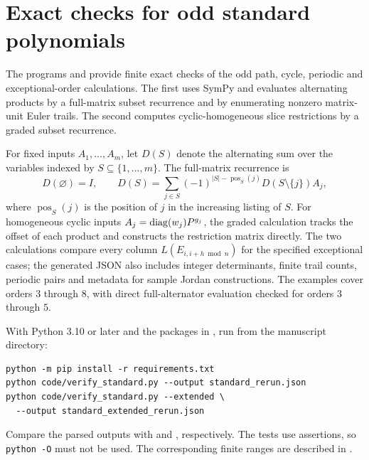 \section{Exact checks for odd standard polynomials}\label{app:verification}
The programs  and
 provide finite exact checks of the odd
path, cycle, periodic and exceptional-order calculations.
The first uses SymPy and evaluates alternating products by a
full-matrix subset recurrence and by enumerating nonzero
matrix-unit Euler trails. The second computes cyclic-homogeneous
slice restrictions by a graded subset recurrence.

For fixed inputs $A_1,\ldots,A_m$, let $D(S)$ denote the alternating
sum over the variables indexed by $S\subseteq\{1,\ldots,m\}$.
The full-matrix recurrence is
\begin{equation}\label{eq:dp}
 D(\varnothing)=I,\qquad
 D(S)=\sum_{j\in S}(-1)^{|S|-\operatorname{pos}_S(j)}
 D(S\setminus\{j\})A_j,
\end{equation}
where $\operatorname{pos}_S(j)$ is the position of $j$ in the
increasing listing of $S$. For homogeneous cyclic inputs
$A_j=\operatorname{diag}(w_j)P^{g_j}$, the graded calculation tracks the
offset of each product and constructs the restriction matrix
directly. The two calculations compare every column
$L(E_{i,i+h\bmod n})$ for the specified exceptional cases;
the generated JSON also includes integer determinants,
finite trail counts, periodic pairs and metadata for sample Jordan
constructions. The examples cover orders $3$ through $8$, with
direct full-alternator evaluation checked for orders $3$ through $5$.

With Python 3.10 or later and the packages in
, run from the manuscript directory:
\begin{samepage}
\begin{verbatim}
python -m pip install -r requirements.txt
python code/verify_standard.py --output standard_rerun.json
python code/verify_standard.py --extended \
  --output standard_extended_rerun.json
\end{verbatim}
\end{samepage}
Compare the parsed outputs with
 and
, respectively.
The tests use assertions, so \texttt{python -O} must not be used.
The corresponding finite ranges are described in
.

